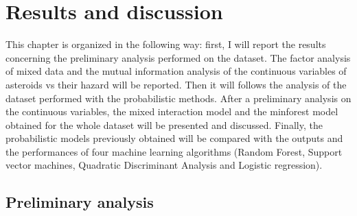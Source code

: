 \documentclass[12pt,%
               a4paper,%
               oneside,openany,%
               titlepage,%
               headinclude,footinclude,%
               BCOR5mm,%
               cleardoublepage=empty,%
               tablecaptionabove,%
               floatperchapter,
               ]{scrreprt}                 %
\begin{document}
\chapter{Results and discussion}

This chapter is organized in the following way: first, I will report the results concerning the preliminary analysis performed on the dataset. The factor analysis of mixed data and the mutual information analysis of the continuous variables of asteroids vs their hazard will be reported. Then it will follows the analysis of the dataset performed with the probabilistic methods. After a preliminary analysis on the continuous variables, the mixed interaction model and the minforest model obtained for the whole dataset will be presented and discussed. Finally, the probabilistic models previously obtained will be compared with the outputs and the performances of four machine learning algorithms (Random Forest, Support vector machines, Quadratic Discriminant Analysis and Logistic regression).

\section{Preliminary analysis}
\end{document}
